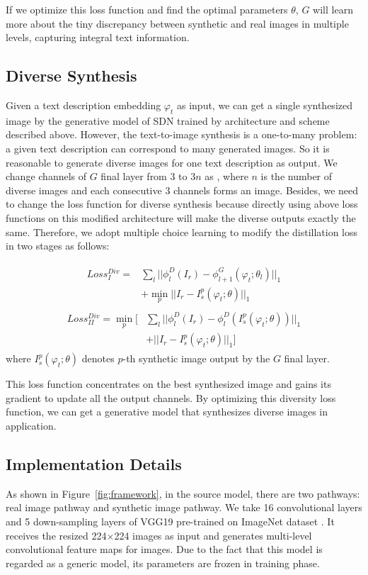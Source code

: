 \documentclass[sigconf]{acmart}
\begin{document}
If we optimize this loss function and find the optimal parameters $\theta$, $G$ will learn more about the tiny discrepancy between synthetic and real images in multiple levels, capturing integral text information.

\subsection{Diverse Synthesis}
Given a text description embedding $\varphi_t$ as input, we can get a single synthesized image by the generative model of SDN trained by architecture and scheme described above. However, the text-to-image synthesis is a one-to-many problem: a given text description can correspond to many generated images. So it is reasonable to generate diverse images for one text description as output. We change channels of $G$ final layer from $3$ to $3n$ as \cite{chen2017photographic}, where $n$ is the number of diverse images and each consecutive 3 channels forms an image. Besides, we need to change the loss function for diverse synthesis because directly using above loss functions on this modified architecture will make the diverse outputs exactly the same. Therefore, we adopt multiple choice learning \cite{guzman2012multiple} to modify the distillation loss in two stages as follows:

\begin{align}
	\begin{split}
		Loss_{I}^{Div} = & \sum_l || \phi_l^D(I_r) - \phi_{l+1}^G(\varphi_t;\theta_l) ||_1 \\
		& + \min_p || I_r - I^p_s(\varphi_t;\theta) ||_1
	\end{split}
\end{align}
\begin{align}
	\begin{split}
		Loss_{II}^{Div} = \min_p [ & \sum_l || \phi_l^D(I_r) - \phi_l^D(I^p_s(\varphi_t;\theta)) ||_1 \\
		& + || I_r - I^p_s(\varphi_t;\theta) ||_1 ]
	\end{split}
\end{align}
where $I^p_s(\varphi_t;\theta)$ denotes $p$-th synthetic image output by the $G$ final layer.

This loss function concentrates on the best synthesized image and gains its gradient to update all the output channels. By optimizing this diversity loss function, we can get a generative model that synthesizes diverse images in application.

\subsection{Implementation Details}
As shown in Figure~\ref{fig:framework}, in the source model, there are two pathways: real image pathway and synthetic image pathway. We take 16 convolutional layers and 5 down-sampling layers of VGG19 \cite{simonyan2014very} pre-trained on ImageNet dataset \cite{krizhevsky2012imagenet}. It receives the resized 224$\times$224 images as input and generates multi-level convolutional feature maps for images. Due to the fact that this model is regarded as a generic model, its parameters are frozen in training phase.
\end{document}

